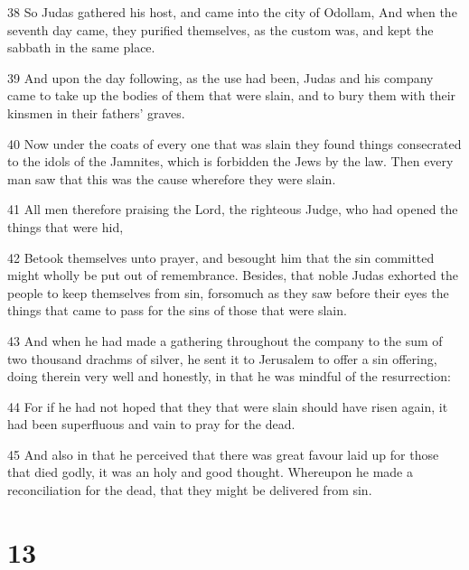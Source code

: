 \par 38 So Judas gathered his host, and came into the city of Odollam, And when the seventh day came, they purified themselves, as the custom was, and kept the sabbath in the same place.
\par 39 And upon the day following, as the use had been, Judas and his company came to take up the bodies of them that were slain, and to bury them with their kinsmen in their fathers' graves.
\par 40 Now under the coats of every one that was slain they found things consecrated to the idols of the Jamnites, which is forbidden the Jews by the law. Then every man saw that this was the cause wherefore they were slain.
\par 41 All men therefore praising the Lord, the righteous Judge, who had opened the things that were hid,
\par 42 Betook themselves unto prayer, and besought him that the sin committed might wholly be put out of remembrance. Besides, that noble Judas exhorted the people to keep themselves from sin, forsomuch as they saw before their eyes the things that came to pass for the sins of those that were slain.
\par 43 And when he had made a gathering throughout the company to the sum of two thousand drachms of silver, he sent it to Jerusalem to offer a sin offering, doing therein very well and honestly, in that he was mindful of the resurrection:
\par 44 For if he had not hoped that they that were slain should have risen again, it had been superfluous and vain to pray for the dead.
\par 45 And also in that he perceived that there was great favour laid up for those that died godly, it was an holy and good thought. Whereupon he made a reconciliation for the dead, that they might be delivered from sin.

\chapter{13}


